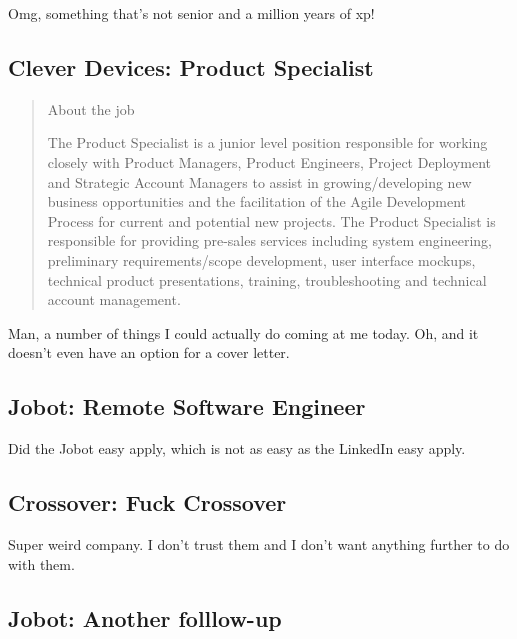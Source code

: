 \documentclass[
	letterpaper, %
	12pt, %
]{CSSullivanBusinessReport}
\begin{document}
Omg, something that's not senior and a million years of xp!


\subsection[Clever Devices]{Clever Devices: Product Specialist}

\begin{quote}
	About the job
	
	The Product Specialist is a junior level position responsible for working closely with Product Managers, Product Engineers, Project Deployment and Strategic Account Managers to assist in growing/developing new business opportunities and the facilitation of the Agile Development Process for current and potential new projects. The Product Specialist is responsible for providing pre-sales services including system engineering, preliminary requirements/scope development, user interface mockups, technical product presentations, training, troubleshooting and technical account management.

\end{quote}

Man, a number of things I could actually do coming at me today. Oh, and it doesn't even have an option for a cover letter. 



\subsection[Jobot]{Jobot: Remote Software Engineer}

Did the Jobot easy apply, which is not as easy as the LinkedIn easy apply. 


\subsection[Crossover]{Crossover: Fuck Crossover}

Super weird company. I don't trust them and I don't want anything further to do with them. 


\subsection[Jobot]{Jobot: Another folllow-up}
\end{document}
